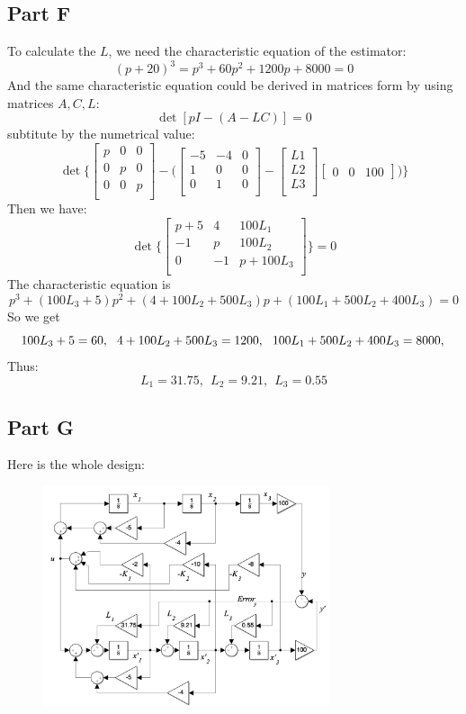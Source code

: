 \documentclass[a4paper]{article}
\begin{document}
\subsection{Part F}
To calculate the $L$, we need the characteristic equation of the estimator:
$$
(p+20)^3 = p^3 + 60p^2 + 1200p + 8000 = 0
$$
And the same characteristic equation could be derived in matrices form by using matrices $A,C,L$:
$$
\det[pI-(A-LC)] = 0
$$
subtitute by the numetrical value:
$$
\det\Bigg\{ 
\left [\begin{matrix}
   p & 0 & 0 \\
   0 & p & 0 \\
   0 & 0 & p \\
\end{matrix}\right ]
-\Bigg(
\left [\begin{matrix}
   -5 & -4 & 0 \\
   1 & 0 & 0 \\
   0 & 1 & 0 \\
\end{matrix}\right ]
- 
\left [\begin{matrix}
   L1\\
   L2\\
   L3\\
\end{matrix}\right ] 
\left [
\begin{matrix}
   0 & 0 & 100 
\end{matrix}
\right ]\Bigg)\Bigg\}
$$
Then we have:
$$
\det\Bigg\{
\left [\begin{matrix}
   p+5 &4 &100L_1\\
   -1 &p  &100L_2\\
   0 &-1 & p + 100L_3\\
\end{matrix}\right ] \Bigg\} = 0
$$
The characteristic equation is
$$
p^3+ (100L_3 + 5)p^2 + (4 + 100L_2 + 500L_3)p +(100L_1 + 500L_2 + 400L_3)
 = 0
$$
So we get
$$
100L_3 + 5 = 60 ,\ \ 4 + 100L_2 + 500L_3 = 1200,\ \ 100L_1 + 500L_2 + 400L_3 = 8000,\\
$$
Thus:
$$
L_1 = 31.75,\ \ L_2 = 9.21,\ \ L_3 = 0.55
$$

\subsection{Part G}
Here is the whole design:
\begin{figure}[H]
\centering
\includegraphics[width = 0.75\textwidth]{pic/4.png}
\end{figure}
\end{document}
